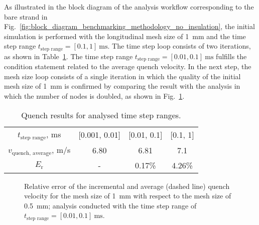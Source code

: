 As illustrated in the block diagram of the analysis workflow corresponding to the bare strand in Fig.~\ref{fig:block_diagram_benchmarking_methodology_no_insulation}, the initial simulation is performed with the longitudinal mesh size of 1~mm and the time step range $t_\text{step range}=[0.1, 1]~\text{ms}$. The time step loop consists of two iterations, as shown in Table~\ref{table: 1d_qv_benchmarking_results_heat_balance_no_insulation}. The time step range $t_\text{step range}=[0.01, 0.1]~\text{ms}$ fulfills the condition statement related to the average quench velocity. In the next step, the mesh size loop consists of a single iteration in which the quality of the initial mesh size of 1~mm is confirmed by comparing the result with the analysis in which the number of nodes is doubled, as shown in Fig.~\ref{fig: q_vel_modelling_v_quench_rel_error_no_insulation}. 

\begin{table}[H]
    \caption{Quench results for analysed time step ranges.} 
    \vspace{-1.em} 
    \fontsize{10}{10}
    \selectfont 
    \renewcommand{\arraystretch}{1.5}
    \begin{center}
        \begin{tabular}{ cccc }  
        \hline
        $t_\text{step range}$, ms & [0.001, 0.01] & [0.01, 0.1] & [0.1, 1] \\
        $v_\text{quench, average}$, m/s & 6.80 & 6.81 & 7.1 \\
        $E_\text{r}$ & - & 0.17\% & 4.26\% \\
        \hline 
        \end{tabular}
    \end{center}  
     \label{table: 1d_qv_benchmarking_results_heat_balance_no_insulation} 
 \end{table}

\begin{figure}[H]
\centering
    \caption{Relative error of the incremental and average (dashed line) quench velocity for the mesh size of 1~mm with respect to the mesh size of 0.5~mm; analysis conducted with the time step range of $t_\text{step range}=[0.01, 0.1]~\text{ms}$.}
    \label{fig: q_vel_modelling_v_quench_rel_error_no_insulation}
\end{figure}

